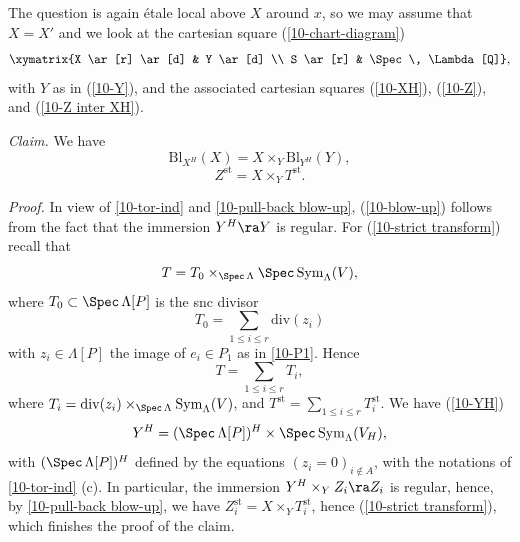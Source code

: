 \documentclass[10pt]{../fichiers-configuration-latex/smfart}
\begin{document}
The question is again étale local above $X$ around $x$, so we may assume
that $X = X'$ and we look at the cartesian square (\ref{10-chart-diagram}) $$
\xymatrix{X \ar[r] \ar[d] & Y \ar[d] \\ S \ar[r] & \Spec \, \Lambda[Q]}, $$ with
$Y$ as in (\ref{10-Y}), and the associated cartesian squares (\ref{10-XH}),
(\ref{10-Z}), and (\ref{10-Z inter XH}).

\textit{Claim.} We have
\begin{equation}\label{10-blow-up}
\mathrm{Bl}_{X^H}(X) = X \times_Y \mathrm{Bl}_{Y^H}(Y),
\end{equation}
\begin{equation}\label{10-strict transform} Z^{\mathrm{st}} = X \times_Y
T^{\mathrm{st}}.
\end{equation}

\textit{Proof.} In view of \ref{10-tor-ind} and \ref{10-pull-back blow-up},
(\ref{10-blow-up}) follows from the fact that the immersion $Y^H \ra
Y$ is regular. For (\ref{10-strict transform}) recall that $$ T = T_0
\times_{\Spec \, \Lambda} \Spec \, \mathrm{Sym}_{\Lambda}(V), $$ where $T_0
\subset \Spec \, \Lambda[P]$ is the snc divisor $$ T_0 = \sum_{1 \le i \le r}
\mathrm{div}(z_i) $$ with $z_i \in \Lambda[P]$ the image of $e_i \in P_1$
as in \ref{10-P1}. Hence
\begin{equation}\label{10-T} T = \sum_{1 \le
i \le r} T_i,
\end{equation}
where $T_i = \mathrm{div}(z_i) \times_{\Spec \,
\Lambda}\mathrm{Sym}_{\Lambda}(V)$, and $T^{\mathrm{st}} = \sum_{1 \le i \le
r}T_i^{\mathrm{st}}$. We have (\ref{10-YH}) $$ Y^H =  (\Spec \, \Lambda[P])^H
\times \Spec \, \mathrm{Sym}_{\Lambda}(V_H), $$ with $(\Spec \, \Lambda[P])^H$
defined by the equations $(z_i = 0)_{i \notin A}$, with the notations of
\ref{10-tor-ind} (c). In particular, the immersion $Y^H \times_Y Z_i \ra Z_i$
is regular, hence, by \ref{10-pull-back blow-up}, we have $Z_i^{\mathrm{st}}
= X \times_Y T_i^{\mathrm{st}}$, hence (\ref{10-strict transform}), which
finishes the proof of the claim.
\end{document}
